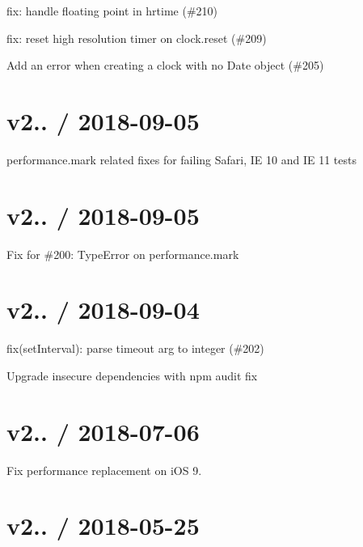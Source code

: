 
\begin{DoxyItemize}
\item fix\+: handle floating point in hrtime (\#210)
\item fix\+: reset high resolution timer on clock.\+reset (\#209)
\item Add an error when creating a clock with no Date object (\#205)
\end{DoxyItemize}

\section*{v2.. / 2018-\/09-\/05 }


\begin{DoxyItemize}
\item performance.\+mark related fixes for failing Safari, IE 10 and IE 11 tests
\end{DoxyItemize}

\section*{v2.. / 2018-\/09-\/05 }


\begin{DoxyItemize}
\item Fix for \#200\+: Type\+Error on performance.\+mark
\end{DoxyItemize}

\section*{v2.. / 2018-\/09-\/04 }


\begin{DoxyItemize}
\item fix(set\+Interval)\+: parse {\ttfamily timeout} arg to integer (\#202)
\item Upgrade insecure dependencies with npm audit fix
\end{DoxyItemize}

\section*{v2.. / 2018-\/07-\/06 }


\begin{DoxyItemize}
\item Fix performance replacement on i\+OS 9.
\end{DoxyItemize}

\section*{v2.. / 2018-\/05-\/25 }


